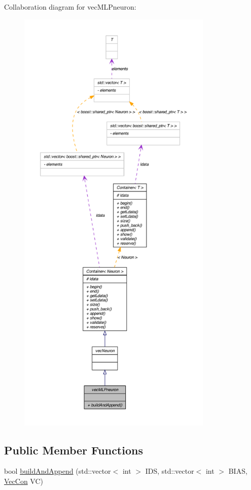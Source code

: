 Collaboration diagram for vecMLPneuron:
\nopagebreak
\begin{figure}[H]
\begin{center}
\leavevmode
\includegraphics[height=600pt]{classvec_m_l_pneuron__coll__graph}
\end{center}
\end{figure}
\subsection*{Public Member Functions}
\begin{DoxyCompactItemize}
\item 
bool \hyperlink{classvec_m_l_pneuron_a2eeb007315309d793615f9c3a3ecd473}{buildAndAppend} (std::vector$<$ int $>$ IDS, std::vector$<$ int $>$ BIAS, \hyperlink{class_vec_con}{VecCon} VC)
\end{DoxyCompactItemize}


